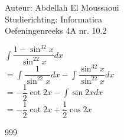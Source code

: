 \documentclass[a4paper]{article}
\begin{document}
  
\noindent \large Auteur: Abdellah El Moussaoui \\
\noindent \large Studierichting: Informatica\\
\noindent \large Oefeningenreeks 4A nr. 10.2\\

\medskip

\normalsize

$\displaystyle\int \dfrac{1-\sin^32x}{\sin^22x}dx$\\

$=\displaystyle\int \dfrac{1}{\sin^22x}dx - \displaystyle\int \dfrac{\sin^32x}{\sin^22x}dx$\\

$=-\dfrac{1}{2}\cot2x - \displaystyle\int \sin2xdx$\\

$=-\dfrac{1}{2}\cot2x + \dfrac{1}{2} \cos2x$\\


\begin{thebibliography}{999}
\end{thebibliography}
\end{document}
